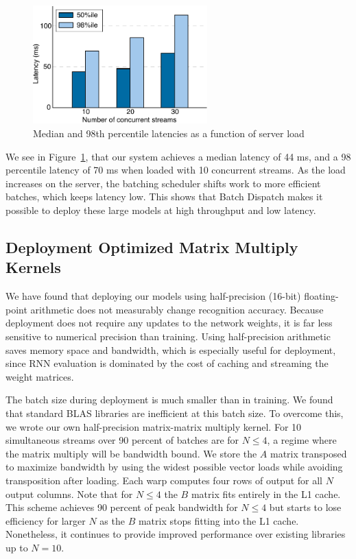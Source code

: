 \begin{figure}[h]
\centering
\includegraphics[width=0.6\textwidth]{deepspeech2/figures/latency.pdf}
\caption{Median and 98th percentile latencies as a function of server load}
\label{fig:deepspeech2:latency}
\end{figure}

We see in Figure~\ref{fig:deepspeech2:latency}, that our system achieves a
median latency of 44 ms, and a 98 percentile latency of 70 ms when loaded with
10 concurrent streams. As the load increases on the server, the batching
scheduler shifts work to more efficient batches, which keeps latency low. This
shows that Batch Dispatch makes it possible to deploy these large models at
high throughput and low latency.

\subsection{Deployment Optimized Matrix Multiply Kernels}

We have found that deploying our models using half-precision (16-bit)
floating-point arithmetic does not measurably change recognition accuracy.
Because deployment does not require any updates to the network weights, it is
far less sensitive to numerical precision than training. Using half-precision
arithmetic saves memory space and bandwidth, which is especially useful for
deployment, since RNN evaluation is dominated by the cost of caching and
streaming the weight matrices.

The batch size during deployment is much smaller than in training. We found
that standard BLAS libraries are inefficient at this batch size. To overcome
this, we wrote our own half-precision matrix-matrix multiply kernel. For 10
simultaneous streams over 90 percent of batches are for $N \leq 4$, a regime
where the matrix multiply will be bandwidth bound.  We store the $A$ matrix
transposed to maximize bandwidth by using the widest possible vector loads
while avoiding transposition after loading.  Each warp computes four rows of
output for all $N$ output columns.  Note that for $N \leq 4$ the $B$ matrix
fits entirely in the L1 cache.  This scheme achieves 90 percent of peak
bandwidth for $N \leq 4$ but starts to lose efficiency for larger $N$ as the
$B$ matrix stops fitting into the L1 cache.  Nonetheless, it continues to
provide improved performance over existing libraries up to $N=10$.

